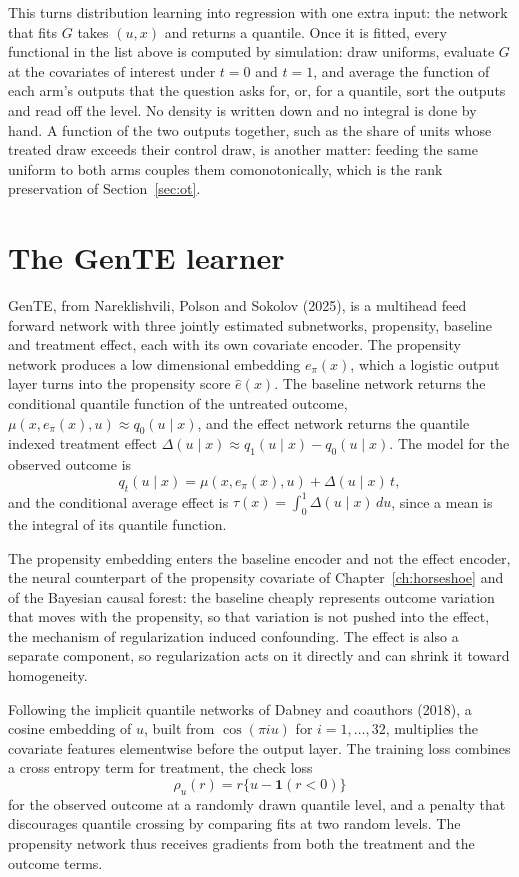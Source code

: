 This turns distribution learning into regression with one extra input: the network that fits $G$ takes $(u, x)$ and returns a quantile. Once it is fitted, every functional in the list above is computed by simulation: draw uniforms, evaluate $G$ at the covariates of interest under $t = 0$ and $t = 1$, and average the function of each arm's outputs that the question asks for, or, for a quantile, sort the outputs and read off the level. No density is written down and no integral is done by hand. A function of the two outputs together, such as the share of units whose treated draw exceeds their control draw, is another matter: feeding the same uniform to both arms couples them comonotonically, which is the rank preservation of Section~\ref{sec:ot}.

\section{The GenTE learner}

GenTE, from Nareklishvili, Polson and Sokolov (2025), is a multihead feed forward network with three jointly estimated subnetworks, propensity, baseline and treatment effect, each with its own covariate encoder. The propensity network produces a low dimensional embedding $e_\pi(x)$, which a logistic output layer turns into the propensity score $\hat e(x)$. The baseline network returns the conditional quantile function of the untreated outcome, $\mu(x, e_\pi(x), u) \approx q_0(u \mid x)$, and the effect network returns the quantile indexed treatment effect $\Delta(u \mid x) \approx q_1(u \mid x) - q_0(u \mid x)$. The model for the observed outcome is
\[
q_t(u \mid x) = \mu(x, e_\pi(x), u) + \Delta(u \mid x)\,t,
\]
and the conditional average effect is $\tau(x) = \int_0^1 \Delta(u \mid x)\,du$, since a mean is the integral of its quantile function.

The propensity embedding enters the baseline encoder and not the effect encoder, the neural counterpart of the propensity covariate of Chapter~\ref{ch:horseshoe} and of the Bayesian causal forest: the baseline cheaply represents outcome variation that moves with the propensity, so that variation is not pushed into the effect, the mechanism of regularization induced confounding. The effect is also a separate component, so regularization acts on it directly and can shrink it toward homogeneity.

Following the implicit quantile networks of Dabney and coauthors (2018), a cosine embedding of $u$, built from $\cos(\pi iu)$ for $i = 1, \ldots, 32$, multiplies the covariate features elementwise before the output layer. The training loss combines a cross entropy term for treatment, the check loss
\[
\rho_u(r) = r\{u - \mathbf{1}(r < 0)\}
\]
for the observed outcome at a randomly drawn quantile level, and a penalty that discourages quantile crossing by comparing fits at two random levels. The propensity network thus receives gradients from both the treatment and the outcome terms.


